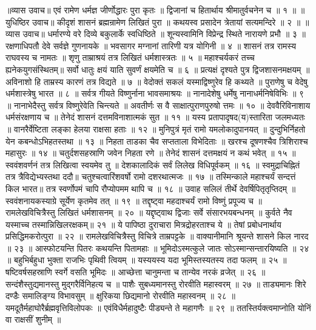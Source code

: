 ॥व्यास उवाच॥
एवं रामेण धर्मज्ञ जीर्णोद्धारः पुरा कृतः ॥
द्विजानां च हितार्थाय श्रीमातुर्वचनेन च ॥ १ ॥
॥युधिष्ठिर उवाच॥
कीदृशं शासनं ब्रह्मन्रामेण लिखितं पुरा ॥
कथयस्व प्रसादेन त्रेतायां सत्यमन्दिरे ॥ २ ॥
॥व्यास उवाच॥
धर्मारण्ये वरे दिव्ये बकुलार्के स्वधिष्ठिते ॥
शून्यस्वामिनि विप्रेन्द्र स्थिते नारायणे प्रभौ ॥ ३ ॥
रक्षणाधिपतौ देवे सर्वज्ञे गुणनायके ॥
भवसागर मग्नानां तारिणी यत्र योगिनी ॥ ४ ॥
शासनं तत्र रामस्य राघवस्य च नामतः ॥
शृणु ताम्राश्रयं तत्र लिखितं धर्मशास्त्रतः ॥ ५ ॥
महाश्चर्यकरं तच्च ह्यनेकयुगसंस्थितम्॥
सर्वो धातुः क्षयं याति सुवर्णं क्षयमेति च ॥ ६ ॥
प्रत्यक्षं दृश्यते पुत्र द्विजशासनमक्षयम् ॥
अविनाशो हि ताम्रस्य कारणं तत्र विद्यते ॥ ७ ॥
वेदोक्तं सकलं यस्माद्विष्णुरेव हि कथ्यते ॥
पुराणेषु च वेदेषु धर्मशास्त्रेषु भारत ॥ ८ ॥
सर्वत्र गीयते विष्णुर्नाना भावसमाश्रयः ॥
नानादेशेषु धर्मेषु नानाधर्मनिषेविभिः ॥ ९ ॥
नानाभेदैस्तु सर्वत्र विष्णुरेवेति चिन्त्यते ॥
अवतीर्णः स वै साक्षात्पुराणपुरुषो त्तमः ॥ १० ॥
देववैरिविनाशाय धर्मसंरक्षणाय च ॥
तेनेदं शासनं दत्तमविनाशात्मकं सुत ॥ ११ ॥
यस्य प्रतापादृषद(य)स्तारिता जलमध्यतः ॥
वानरैर्वेष्टिता लङ्का हेलया राक्षसा हताः ॥ १२ ॥
मुनिपुत्रं मृतं रामो यमलोकादुपानयत् ॥
दुन्दुभिर्निहतो येन कबन्धोऽभिहतस्तथा ॥ १३ ॥
निहता ताडका चैव सप्तताला विभेदिताः ॥
खरश्च दूषणश्चैव त्रिशिराश्च महासुरः ॥ १४ ॥
चतुर्दशसहस्राणि जवेन निहता रणे ॥
तेनेदं शासनं दत्तमक्षयं न कथं भवेत् ॥ १५ ॥
स्ववंशवर्णनं तत्र लिखित्वा स्वयमेव तु ॥
देशकालादिकं सर्वं लिलेख विधिपूर्वकम् ॥ १६ ॥
स्वमुद्राचिह्नितं तत्र त्रैविद्येभ्यस्तथा ददौ॥
चतुश्चत्वारिंशवर्षो रामो दशरथात्मजः ॥ १७ ॥
तस्मिन्काले महाश्चर्यं सन्दत्तं किल भारत॥
तत्र स्वर्णोपमं चापि रौप्योपमम थापि च ॥ १८ ॥
उवाह सलिलं तीर्थे देवर्षिपितृतृप्तिदम् ॥
स्ववंशनायकस्याग्रे सूर्येण कृतमेव तत् ॥ १९ ॥
तद्दृष्ट्वा महदाश्चर्यं रामो विष्णुं प्रपूज्य च ॥
रामलेखविचित्रैस्तु लिखितं धर्मशासनम् ॥ २० ॥
यद्दृष्ट्वाथ द्विजाः सर्वे संसारभयबन्धनम् ॥
कुर्वते नैव यस्माच्च तस्मान्निखिलरक्षकम्॥ २१ ॥
ये पापिष्ठा दुराचारा मित्रद्रोहरताश्च ये ॥
तेषां प्रबोधनार्थाय प्रसिद्धिमकरोत्पुरा ॥ २२ ॥
रामलेखविचित्रैस्तु विचित्रे ताम्रपट्टके ॥
वाक्यानीमानि श्रूयन्ते शासने किल नारद ॥ २३ ॥
आस्फोटयन्ति पितरः कथयन्ति पितामहाः ॥
भूमिदोऽस्मत्कुले जातः सोऽस्मान्सन्तारयिष्यति ॥ २४ ॥
बहुभिर्बहुधा भुक्ता राजभिः पृथिवी त्वियम् ॥
यस्ययस्य यदा भूमिस्तस्यतस्य तदा फलम् ॥ २५ ॥
षष्टिवर्षसहस्राणि स्वर्गे वसति भूमिदः ॥
आच्छेत्ता चानुमन्ता च तान्येव नरकं व्रजेत् ॥ २६ ॥
सन्दंशैस्तुद्यमानस्तु मुद्गरैर्विनिहत्य च ॥
पाशैः सुबध्यमानस्तु रोरवीति महास्वरम् ॥ २७ ॥
ताड्यमानः शिरे दण्डैः समालिङ्ग्य विभावसुम् ॥
क्षुरिकया छिद्यमानो रोरवीति महास्वनम् ॥ २८ ॥
यमदूतैर्महाघोरैर्ब्रह्मवृत्तिविलोपकः ॥
एवंविधैर्महादुष्टैः पीड्यन्ते ते महागणैः ॥ २९ ॥
ततस्तिर्यक्त्वमाप्नोति योनिं वा राक्षसीं शुनीम् ॥
